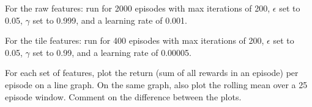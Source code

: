 \documentclass[11pt,addpoints,answers]{exam}
\begin{document}
\begin{questions}
\begin{parts}
For the raw features: run for 2000 episodes with max iterations of 200, $\epsilon$ set to 0.05, $\gamma$ set to 0.999, and a learning rate of 0.001. 

For the tile features: run for 400 episodes with max iterations of 200, $\epsilon$ set to 0.05, $\gamma$ set to 0.99, and a learning rate of 0.00005.

For each set of features, plot the return (sum of all rewards in an episode) per episode on a line graph. On the same graph, also plot the rolling mean over a 25 episode window. Comment on the difference between the plots.

\begin{your_solution}[title=Plot of Raw, height=10cm,width=15cm]
\end{your_solution}

\begin{your_solution}[title=Plot of Tile,height=10cm,width=15cm]
\end{your_solution}

\begin{your_solution}[title=Comment,height=5cm,width=15cm]
\end{your_solution}

\clearpage





\end{parts}
\end{questions}
\end{document}
